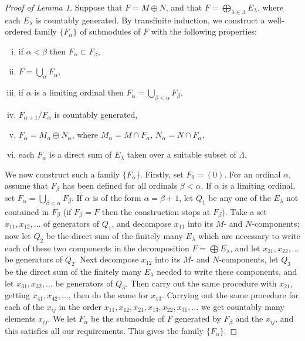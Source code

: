 \begin{proof}[Proof of Lemma 1]
\renewcommand{\qedsymbol}{}%
Suppose that $F = M \oplus N$, and that $F = \bigoplus_{\lambda \in \Lambda} E_\lambda$, where
each $E_\lambda$ is countably generated. By transfinite induction, we construct a
well-ordered family $\{F_\alpha\}$ of submodules of $F$ with the following properties:
\begin{enumerate}[(i)]
  \item if $\alpha < \beta$ then $F_\alpha \subset F_\beta$,
  \item $F = \bigcup_\alpha F_\alpha$,
  \item if $\alpha$ is a limiting ordinal then $F_\alpha = \bigcup_{\beta < \alpha} F_\beta$,
  \item $F_{\alpha+1}/F_\alpha$ is countably generated,
  \item $F_\alpha = M_\alpha \oplus N_\alpha$, where $M_\alpha = M \cap F_\alpha$, $N_\alpha = N \cap F_\alpha$,
  \item each $F_\alpha$ is a direct sum of $E_\lambda$ taken over a suitable subset of $\Lambda$.
\end{enumerate}
We now construct such a family $\{F_\alpha\}$. Firstly, set $F_0 = (0)$. For an
ordinal $\alpha$, assume that $F_\beta$ has been defined for all ordinals $\beta < \alpha$. If $\alpha$ is
a limiting ordinal, set $F_\alpha = \bigcup_{\beta<\alpha} F_\beta$. If $\alpha$ is of the form $\alpha = \beta + 1$, let $Q_1$
be any one of the $E_\lambda$ not contained in $F_\beta$ (if $F_\beta = F$ then the construction
stops at $F_\beta$). Take a set $x_{11}, x_{12}, \ldots$ of generators of $Q_1$, and decompose $x_{11}$
into its $M$- and $N$-components; now let $Q_2$ be the direct sum of the
finitely many $E_\lambda$ which are necessary to write each of these two components
in the decomposition $F = \bigoplus E_\lambda$, and let $x_{21}, x_{22}, \ldots$ be generators of $Q_2$.
Next decompose $x_{12}$ into its $M$- and $N$-components, let $Q_3$ be the direct
sum of the finitely many $E_\lambda$ needed to write these components, and let
$x_{31}, x_{32}, \ldots$ be generators of $Q_3$. Then carry out the same procedure with
$x_{21}$, getting $x_{41}, x_{42}, \ldots$, then do the same for $x_{13}$. Carrying out the same
procedure for each of the $x_{ij}$ in the order $x_{11}, x_{12}, x_{21}, x_{13}, x_{22}, x_{31}, \ldots$ we get
countably many elements $x_{ij}$. We let $F_\alpha$ be the submodule of $F$ generated
by $F_\beta$ and the $x_{ij}$, and this satisfies all our requirements. This gives the
family $\{F_\alpha\}$.


\end{proof}
